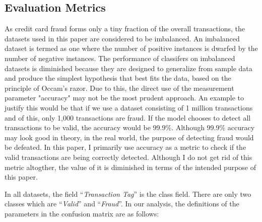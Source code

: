 \documentclass[conference]{IEEEtran}
\newcommand\MyBox[2]{
  \fbox{\lower0.75cm
    \vbox to 1.7cm{\vfil
      \hbox to 1.7cm{\hfil\parbox{1.4cm}{#1\\#2}\hfil}
      \vfil}%
  }%
}
\begin{document}


\subsection{Evaluation Metrics}

As credit card fraud forms only a tiny fraction of the overall transactions, the datasets used in this paper are considered to be imbalanced. An imbalanced dataset is termed as one where the number of positive instances is dwarfed by the number of negative instances. The performance of classifers on imbalanced datasets is diminished because they are designed to generalize from sample data and produce the simplest hypothesis that best fits the data, based on the principle of Occam’s razor.\cite{akbani2004} Due to this, the direct use of the measurement parameter "accuracy" may not be the most prudent approach. An example to justify this would be that if we use a dataset consisting of 1 million transactions and of this, only 1,000 transactions are fraud. If the model chooses to detect all transactions to be valid, the accuracy would be 99.9\%. Although 99.9\% accuracy may look good in theory, in the real world, the purpose of detecting fraud would be defeated. In this paper, I primarily use accuracy as a metric to check if the valid transactions are being correctly detected. Although I do not get rid of this metric altogther, the value of it is diminished in terms of the intended purpose of this paper.

In all datasets, the field ``\textit{Transaction Tag}'' is the class field. There are only two classes which are ``\textit{Valid}'' and ``\textit{Fraud}''. In our analysis, the definitions of the parameters in the confusion matrix are as follows:

\end{document}
